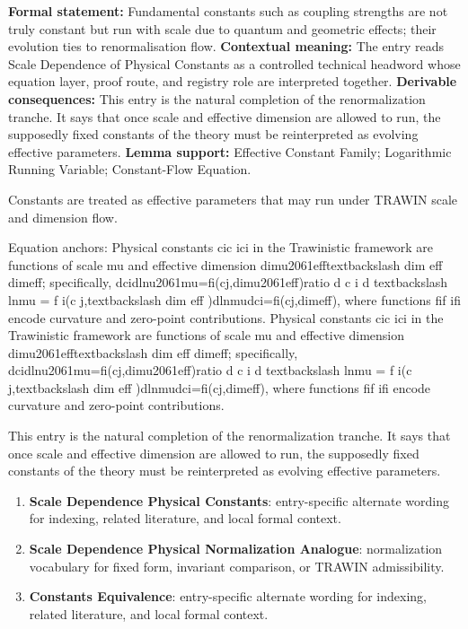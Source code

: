 \begingroup\footnotesize\setlength{\emergencystretch}{3em}\sloppy
\textbf{Formal statement:} Fundamental constants such as coupling strengths are not truly constant but run with scale due to quantum and geometric effects; their evolution ties to renormalisation flow. \textbf{Contextual meaning:} The entry reads Scale Dependence of Physical Constants as a controlled technical headword whose equation layer, proof route, and registry role are interpreted together. \textbf{Derivable consequences:} This entry is the natural completion of the renormalization tranche. It says that once scale and effective dimension are allowed to run, the supposedly fixed constants of the theory must be reinterpreted as evolving effective parameters. \textbf{Lemma support:} Effective Constant Family; Logarithmic Running Variable; Constant-Flow Equation.\par
\endgroup

Constants are treated as effective parameters that may run under TRAWIN scale and dimension flow.

Equation anchors: Physical constants cic ici in the Trawinistic framework are functions of scale mu and effective dimension dimu2061efftextbackslash dim eff dimeff; specifically, dcidlnu2061mu=fi(cj,dimu2061eff)ratio d c i d textbackslash lnmu = f i(c j,textbackslash dim eff )dlnmudci=fi(cj,dimeff), where functions fif ifi encode curvature and zero-point contributions. Physical constants cic ici in the Trawinistic framework are functions of scale mu and effective dimension dimu2061efftextbackslash dim eff dimeff; specifically, dcidlnu2061mu=fi(cj,dimu2061eff)ratio d c i d textbackslash lnmu = f i(c j,textbackslash dim eff )dlnmudci=fi(cj,dimeff), where functions fif ifi encode curvature and zero-point contributions.

This entry is the natural completion of the renormalization tranche. It says that once scale and effective dimension are allowed to run, the supposedly fixed constants of the theory must be reinterpreted as evolving effective parameters.
\endgroup

\begingroup\footnotesize\sloppy
\begin{enumerate}[leftmargin=1.35em,itemsep=1pt,topsep=1pt,parsep=0pt]
\item \textbf{Scale Dependence Physical Constants}: entry-specific alternate wording for indexing, related literature, and local formal context.
\item \textbf{Scale Dependence Physical Normalization Analogue}: normalization vocabulary for fixed form, invariant comparison, or TRAWIN admissibility.
\item \textbf{Constants Equivalence}: entry-specific alternate wording for indexing, related literature, and local formal context.
\end{enumerate}
\endgroup

